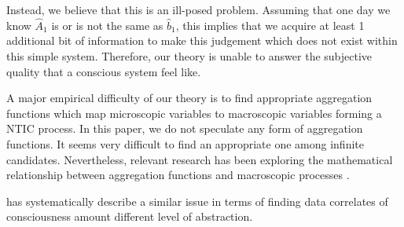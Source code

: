 \documentclass[utf8]{article}
\begin{document}
        Instead, we believe that this is an ill-posed problem. Assuming that one day we know $\hat{A}_1$ is or is not the same as $\hat{b}_1$, this implies that we acquire at least 1 additional bit of information to make this judgement which does not exist within this simple system. Therefore, our theory is unable to answer the subjective quality that a conscious system feel like. 
        
        
    
        A major empirical difficulty of our theory is to find appropriate aggregation functions which map microscopic variables to macroscopic variables forming a NTIC process. In this paper, we do not speculate any form of aggregation functions. It seems very difficult to find an appropriate one among infinite candidates. Nevertheless, relevant research has been exploring the mathematical relationship between aggregation functions and macroscopic processes \citep{PFANTE.2014}. 
        
        
        
        
        
        \cite{Gamez2016} has systematically describe a similar issue in terms of finding data correlates of consciousness amount different 
        level of abstraction. 
        
\end{document}
